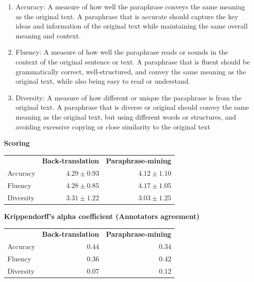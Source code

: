 \documentclass[fleqn,moreauthors,10pt]{ds_report}
\begin{document}
\begin{enumerate}
    \item Accuracy: A measure of how well the paraphrase conveys the same meaning as the original text. A paraphrase that is accurate should capture the key ideas and information of the original text while maintaining the same overall meaning and context.

    \item Fluency: A measure of how well the paraphrase reads or sounds in the context of the original sentence or text. A paraphrase that is fluent should be grammatically correct, well-structured, and convey the same meaning as the original text, while also being easy to read or understand.

    \item Diversity: A measure of how different or unique the paraphrase is from the original text. A paraphrase that is diverse or original should convey the same meaning as the original text, but using different words or structures, and avoiding excessive copying or close similarity to the original text
\end{enumerate}

\textbf{Scoring}

\begin{table}[!h]
\begin{tabular}{lrr}
          & \multicolumn{1}{c}{\textbf{Back-translation}} & \multicolumn{1}{c}{\textbf{Paraphrase-mining}} \\
Accuracy  & $4.29 \pm 0.93$                                       & $4.12 \pm 1.10$                                              \\
Fluency   & $4.28 \pm 0.85$                                       & $4.17 \pm 1.05$                                              \\
Diversity & $3.31 \pm 1.22$                                       & $3.03 \pm 1.25$                             

\end{tabular}
\end{table}

\textbf{Krippendorff's alpha coefficient (Annotators agreement)}

\begin{table}[!h]
\begin{tabular}{lrr}
          & \multicolumn{1}{c}{\textbf{Back-translation}} & \multicolumn{1}{c}{\textbf{Paraphrase-mining}} \\
Accuracy  & $0.44$                                       & $0.34$                                              \\
Fluency   & $0.36$                                       & $0.42$                                              \\
Diversity & $0.07$                                       & $0.12$                             

\end{tabular}
\end{table} 
\end{document}
